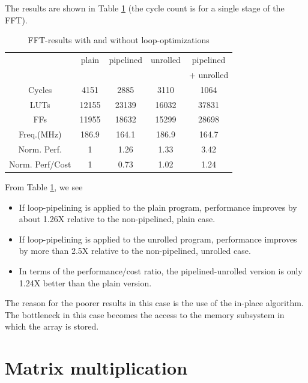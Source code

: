 \documentclass[conference]{IEEEtran}
\begin{document}
The results are shown in Table \ref{table:fft} (the cycle count is for a single
stage of the FFT).
\begin{table}[htb]
  \centering
  \caption{FFT-results  with and without loop-optimizations}
  \label{table:fft}
  \renewcommand\arraystretch{1.2}
  \setlength{\tabcolsep}{1ex}
  \begin{tabular}{c|c|c|c|c}
  \hline
  & plain & pipelined & unrolled & pipelined  \\
  &       &           &          & + unrolled\\
  \hline

Cycles   &    4151  &   2885   &     3110  &     1064 \\
LUTs     &   12155   &  23139  &     16032  &    37831 \\
FFs      &    11955  &  18632  &     15299  &    28698 \\
Freq.(MHz)  & 186.9  &    164.1 &      186.9 &    164.7 \\
Norm. Perf. & 1      &  1.26  & 1.33 & 3.42 \\
Norm. Perf/Cost & 1  &  0.73  & 1.02 & 1.24 \\
\hline
  \end{tabular}
\end{table}
From Table \ref{table:fft}, we see 
\begin{itemize}
\item If loop-pipelining is 
applied to the plain program, performance improves
by about 1.26X relative to the non-pipelined, plain case.
\item If loop-pipelining is applied to the unrolled program,
performance improves by more than 2.5X relative to the non-pipelined,
unrolled case.  
\item In terms of the performance/cost
ratio, the pipelined-unrolled version is only 1.24X better than
the plain version.   
\end{itemize}
The reason for the poorer results in this case is the use of the in-place
algorithm.  The bottleneck in this case becomes the access to the memory
subsystem in which the array is stored. 

\section{Matrix multiplication}
\end{document}
